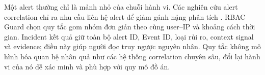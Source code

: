 Một alert thường chỉ là mảnh nhỏ của chuỗi hành vi. Các nghiên cứu alert
correlation chỉ ra nhu cầu liên hệ alert để giảm gánh nặng phân tích
\citep{Valdes2001AlertCorrelation,Zhou2007AlertCorrelation}. RBAC Guard chọn
quy tắc gom nhóm đơn giản theo cùng user--IP và khoảng cách thời gian. Incident
kết quả giữ toàn bộ alert ID, Event ID, loại rủi ro, context signal và evidence;
điều này giúp người đọc truy ngược nguyên nhân. Quy tắc không mô hình hóa quan
hệ nhân quả như các hệ thống correlation chuyên sâu, đổi lại hành vi của nó dễ
xác minh và phù hợp với quy mô đồ án.
